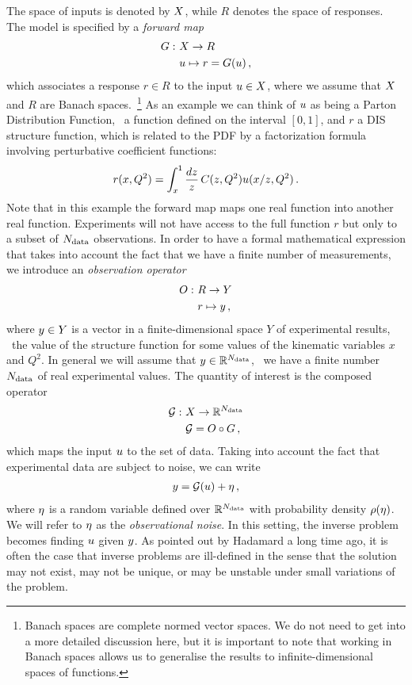 The space of inputs is denoted by $X$, while $R$ denotes the space of responses.
The model is specified by a {\em forward map}
\begin{align}
  \label{eq:ForwardMap}
  G : ~& X \to R \nonumber \\
      & u \mapsto r=G(u) \, ,
\end{align}
which associates a response $r \in R$ to the input $u \in X$,
where we assume that $X$ and $R$ are Banach spaces.~\footnote{Banach
spaces are complete normed vector spaces. We do not need to get into a more
detailed discussion here, but it is important to note that working in Banach
spaces allows us to generalise the results to infinite-dimensional spaces of
functions.} As an example we can think of $u$ as being a Parton
Distribution Function, \ie\ a function defined on the interval $[0,1]$, and $r$
a DIS structure function, which is related to the PDF by a factorization formula
involving perturbative coefficient functions: 
\begin{align}
  \label{eq:DISExample}
  r(x,Q^2) = \int_x^1 \frac{dz}{z}\, C(z,Q^2) u(x/z,Q^2)\, .
\end{align}
Note that in this example the forward map maps one real function into another
real function. Experiments will not have access to the full function $r$ but
only to a subset of $N_{\rm data}$ observations. In order to have a formal
mathematical expression that takes into account the fact that we have a finite
number of measurements, we introduce an {\em observation operator}
\begin{align}
  O : ~& R \to Y \nonumber \\
       & r \mapsto y \, ,
\end{align}
where $y \in Y$ is a vector in a finite-dimensional space $Y$ of experimental
results, \eg\ the value of the structure function for some values of the
kinematic variables $x$ and $Q^2$. In general we will assume that $y \in
\mathbb{R}^{N_{\rm data}}$, \ie\ we have a finite number $N_{\rm data}$ of real experimental
values. The quantity of interest is the composed operator
\begin{align}
  \mathcal{G} : ~& X \to \mathbb{R}^{N_{\rm data}} \nonumber \\
                 & \mathcal{G} = O \circ G\, ,
\end{align}
which maps the input $u$ to the set of data. Taking into account the
fact that experimental data are subject to noise, we can write
\begin{align}
  \label{eq:NoisyInverseProblem}
  y = \mathcal{G}(u) + \eta\, ,
\end{align}
where $\eta$ is a random variable defined over $\mathbb{R}^{N_{\rm data}}$ with
probability density $\rho(\eta)$. We will refer to $\eta$ as the {\em
observational noise}. In this setting, the inverse problem becomes finding
$u$ given $y$. As pointed out by Hadamard a long time ago, it is
often the case that inverse problems are ill-defined in the sense that the
solution may not exist, may not be unique, or may be unstable under small
variations of the problem. 

